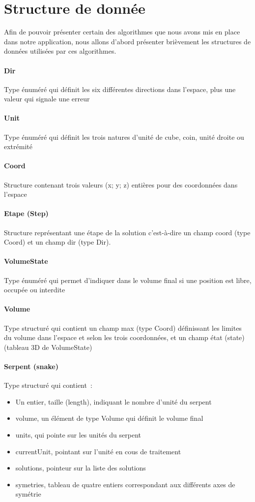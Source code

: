 \section{Structure de donnée}
Afin de pouvoir présenter certain des algorithmes que nous avons mis en place dans notre application, nous allons d'abord présenter brièvement les structures de données utilisées par ces algorithmes.

\paragraph{Dir} Type énuméré qui définit les six différentes directions dans l’espace, plus une valeur qui signale une erreur
\paragraph{Unit} Type énuméré qui définit les trois natures d’unité de cube, coin, unité droite ou extrémité
\paragraph{Coord} Structure contenant trois valeurs (x; y; z) entières pour des coordonnées dans l’espace
\paragraph{Etape (Step)} Structure représentant une étape de la solution c’est-à-dire un champ coord (type Coord) et un champ dir (type Dir).
\paragraph{VolumeState} Type énuméré qui permet d’indiquer dans le volume final si une position est libre, occupée ou interdite
\paragraph{Volume} Type structuré qui contient un champ max (type Coord) définissant les limites du volume dans l’espace et selon les trois coordonnées, et un champ état (state) (tableau 3D de VolumeState)
\paragraph{Serpent (snake)} Type structuré qui contient : 
\begin{itemize}
 \item Un entier, taille (length), indiquant le nombre d’unité du serpent 
 \item volume, un élément de type Volume qui définit le volume final
 \item units, qui pointe sur les unités du serpent 
 \item currentUnit, pointant sur l’unité en cous de traitement 
 \item solutions, pointeur sur la liste des solutions 
 \item symetries, tableau de quatre entiers correspondant aux différents axes de symétrie
\end{itemize}
